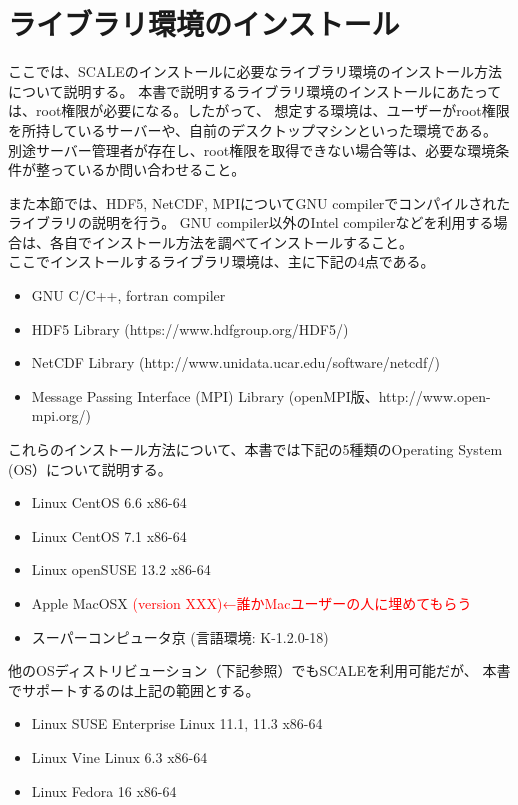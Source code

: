 \chapter{ライブラリ環境のインストール}
\label{sec:env_setting}

ここでは、SCALEのインストールに必要なライブラリ環境のインストール方法について説明する。
本書で説明するライブラリ環境のインストールにあたっては、root権限が必要になる。したがって、
想定する環境は、ユーザーがroot権限を所持しているサーバーや、自前のデスクトップマシンといった環境である。
別途サーバー管理者が存在し、root権限を取得できない場合等は、必要な環境条件が整っているか問い合わせること。

また本節では、HDF5, NetCDF, MPIについてGNU compilerでコンパイルされたライブラリの説明を行う。
GNU compiler以外のIntel compilerなどを利用する場合は、各自でインストール方法を調べてインストールすること。\\

\noindent ここでインストールするライブラリ環境は、主に下記の4点である。
\begin{itemize}
\item GNU C/C++, fortran compiler
\item HDF5 Library (https://www.hdfgroup.org/HDF5/)
\item NetCDF Library (http://www.unidata.ucar.edu/software/netcdf/)
\item Message Passing Interface (MPI) Library (openMPI版、http://www.open-mpi.org/)
\end{itemize}
これらのインストール方法について、本書では下記の5種類のOperating System (OS）について説明する。
\begin{itemize}
\item Linux CentOS 6.6 x86-64
\item Linux CentOS 7.1 x86-64
\item Linux openSUSE 13.2 x86-64
\item Apple MacOSX \textcolor{red}{(version XXX)←誰かMacユーザーの人に埋めてもらう}
\item スーパーコンピュータ京 (言語環境: K-1.2.0-18)
\end{itemize}
他のOSディストリビューション（下記参照）でもSCALEを利用可能だが、
本書でサポートするのは上記の範囲とする。\\

\begin{itemize}
\item Linux SUSE Enterprise Linux 11.1, 11.3 x86-64
\item Linux Vine Linux 6.3 x86-64
\item Linux Fedora 16 x86-64
\end{itemize}


